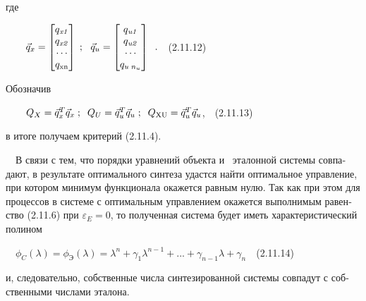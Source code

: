 \documentclass[a4paper]{article}
\newcommand\normalsubformula[1]{\text{\mathversion{normal}$#1$}}
\begin{document}
{\begin{russian}\sffamily
где
\end{russian}}

{\begin{russian}\sffamily
\ \ \ \  $\vec q_x=\left[\begin{matrix}q_{\mathit{x1}}\\q_{\mathit{x2}}\\\cdots
\\q_{\normalsubformula{\text{xn}}}\end{matrix}\right]\;;\ \ \vec
q_u=\left[\begin{matrix}q_{\mathit{u1}}\\q_{\mathit{u2}}\\\cdots \\q_{u\;n_u}\end{matrix}\right]\;\;.$\ \ (2.11.12)
\end{russian}}

{\begin{russian}\sffamily
Обозначив
\end{russian}}

{\begin{russian}\sffamily
\ \ \ \  $Q_X=\vec q_x^T\vec q_x\;;\;\;Q_U=\vec q_u^T\vec q_u\;;\;\;Q_{\normalsubformula{\text{XU}}}=\vec q_u^T\vec
q_u$,\ \ (2.11.13)
\end{russian}}

{\begin{russian}\sffamily
в итоге получаем критерий (2.11.4).
\end{russian}}

{\begin{russian}\sffamily
\ \ В связи с тем, что порядки уравнений объекта и \ эталонной системы совпадают, в результате оптимального синтеза
удастся найти оптимальное управление, при котором минимум функционала окажется равным нулю. Так как при этом для
процессов в системе с оптимальным управлением окажется выполнимым равенство (2.11.6) при  $ε_E=0$, то полученная
система будет иметь характеристический полином
\end{russian}}

{\begin{russian}\sffamily
\ \  $ϕ_C(λ)=ϕ_Э(λ)=λ^n+γ_1λ^{n-1}+...+γ_{n-1}λ+γ_n$\ \ (2.11.14)
\end{russian}}

{\begin{russian}\sffamily
и, следовательно, собственные числа синтезированной системы совпадут с собственными числами эталона.
\end{russian}}
\end{document}
